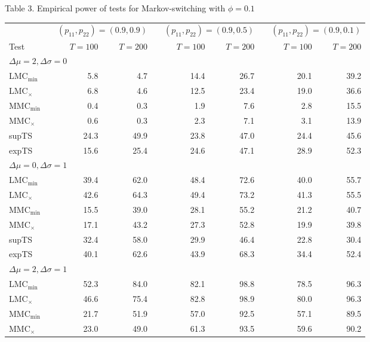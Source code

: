 \documentclass[11pt]{article}
\begin{document}
\begin{table}[p]
\begin{center}
Table 3. Empirical power of tests for Markov-switching with $\phi=0.1$
\medskip
\par
\begin{tabular}{lrrrrrrrrr}
\hline\hline
&  & \multicolumn{2}{c}{$(p_{11}, p_{22})=(0.9, 0.9)$} &  & 
\multicolumn{2}{c}{$(p_{11}, p_{22})=(0.9, 0.5)$} &  & \multicolumn{2}{c}{$%
(p_{11}, p_{22})=(0.9, 0.1)$} \\ \cline{3-4}\cline{6-7}\cline{9-10}
Test &  & $T=100$ & $T=200$ &  & $T=100$ & $T=200$ &  & $T=100$ & $T=200$ \\ 
\hline
\multicolumn{10}{l}{$\Delta \mu =2, \Delta \sigma=0$} \\ 
LMC$_{\min}$ &  & 5.8 & 4.7 &  & 14.4 & 26.7 &  & 20.1 & 39.2 \\ 
LMC$_{\times}$ &  & 6.8 & 4.6 &  & 12.5 & 23.4 &  & 19.0 & 36.6 \\ 
MMC$_{\min}$ &  & 0.4 & 0.3 &  & 1.9 & 7.6 &  & 2.8 & 15.5 \\ 
MMC$_{\times}$ &  & 0.6 & 0.3 &  & 2.3 & 7.1 &  & 3.1 & 13.9 \\ 
supTS &  & 24.3 & 49.9 &  & 23.8 & 47.0 &  & 24.4 & 45.6 \\ 
expTS &  & 15.6 & 25.4 &  & 24.6 & 47.1 &  & 28.9 & 52.3 \\ 
\multicolumn{10}{l}{$\Delta \mu =0, \Delta \sigma=1$} \\ 
LMC$_{\min}$ &  & 39.4 & 62.0 &  & 48.4 & 72.6 &  & 40.0 & 55.7 \\ 
LMC$_{\times}$ &  & 42.6 & 64.3 &  & 49.4 & 73.2 &  & 41.3 & 55.5 \\ 
MMC$_{\min}$ &  & 15.5 & 39.0 &  & 28.1 & 55.2 &  & 21.2 & 40.7 \\ 
MMC$_{\times}$ &  & 17.1 & 43.2 &  & 27.3 & 52.8 &  & 19.9 & 39.8 \\ 
supTS &  & 32.4 & 58.0 &  & 29.9 & 46.4 &  & 22.8 & 30.4 \\ 
expTS &  & 40.1 & 62.6 &  & 43.9 & 68.3 &  & 34.4 & 52.4 \\ 
\multicolumn{10}{l}{$\Delta \mu =2, \Delta \sigma=1$} \\ 
LMC$_{\min}$ &  & 52.3 & 84.0 &  & 82.1 & 98.8 &  & 78.5 & 96.3 \\ 
LMC$_{\times}$ &  & 46.6 & 75.4 &  & 82.8 & 98.9 &  & 80.0 & 96.3 \\ 
MMC$_{\min}$ &  & 21.7 & 51.9 &  & 57.0 & 92.5 &  & 57.1 & 89.5 \\ 
MMC$_{\times}$ &  & 23.0 & 49.0 &  & 61.3 & 93.5 &  & 59.6 & 90.2 \\ 

\end{tabular}
\end{center}
\end{table}
\end{document}
